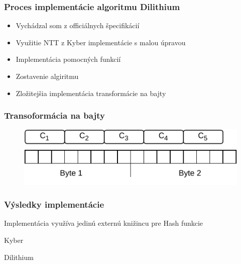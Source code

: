 \documentclass[%
  14pt,       				%
	t,                  %
	aspectratio=1610,   %
	unicode,						%
]{beamer}				    	%
\begin{document}
\begin{frame}[c]
	\frametitle{Proces implementácie algoritmu Dilithium}
	\large{
		\begin{itemize}
			\item Vychádzal som z officiálnych špecifikácií
			\item Využitie NTT z Kyber implementácie s malou úpravou
			\item Implementácia pomocných funkcií
			\item Zostavenie algiritmu
			\item Zložitejšia implementácia transformácie na bajty
		\end{itemize}
	}
\end{frame}

\begin{frame}[c]
	\frametitle{Transoformácia na bajty}
	\begin{figure}[htbp]
		\centering
		\includegraphics[width=\textwidth]{pictures/bit_packing.pdf}
	\end{figure}
\end{frame}


\begin{frame}[c]
	\frametitle{Výsledky implementácie}
	Implementácia využíva jedinú externú knižincu pre Hash funkcie
	\begin{table}[htbp]
		\centering
		
		\caption{Kyber}
	\end{table}
	\begin{table}[htbp]
		\centering
		
		\caption{Dilithium}
	\end{table}
\end{frame}

\end{document}
